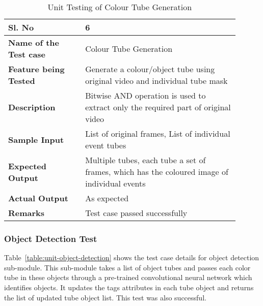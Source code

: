         \FloatBarrier
        \begin{table}[H]
            \caption{Unit Testing of Colour Tube Generation}
            \begin{tabular}{|p{0.3\linewidth}|p{0.6\linewidth}|}
                \hline
                \textbf{Sl. No }              &\textbf{ 6}\\
                \hline
                \textbf{Name of the Test case}& Colour Tube Generation \\
                \hline
                \textbf{Feature being Tested}  & Generate a colour/object tube
                using original video and individual tube mask \\
                \hline
                \textbf{Description}           & Bitwise AND operation is used
                to extract only the required part of original video \\
                \hline
                \textbf{Sample Input}          & List of original frames, List
                of individual event tubes \\
                \hline
                \textbf{Expected Output}       & Multiple tubes, each tube a
                set of frames, which has the coloured image of individual events \\
                \hline
                \textbf{Actual Output}         & As expected \\
                \hline
                \textbf{Remarks }              & Test case passed successfully \\
                \hline
            \end{tabular}
            \label{table:unit-colour-tube-generation}
        \end{table}


        \subsubsection{Object Detection Test}

        Table~\ref{table:unit-object-detection} shows the test case details for
        object detection sub-module. This sub-module takes a list of object
        tubes and passes each color tube in these objects through a pre-trained
        convolutional neural network which identifies objects. It updates the
        tags attributes in each tube object and returns the list of updated
        tube object list. This test was also successful.

